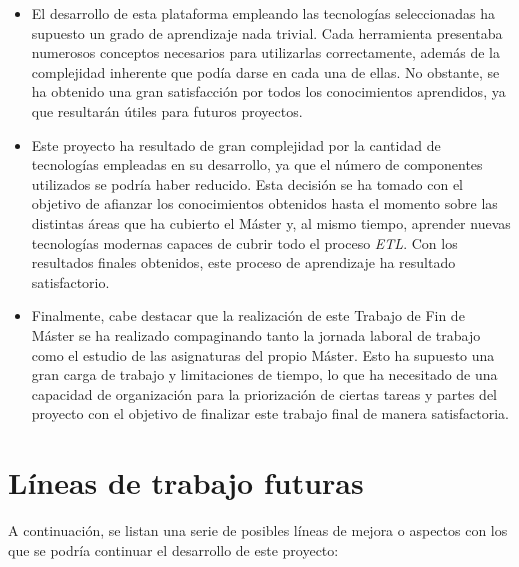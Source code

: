 \begin{itemize}
    \item El desarrollo de esta plataforma empleando las tecnologías seleccionadas ha supuesto un grado de aprendizaje nada trivial. Cada herramienta presentaba numerosos conceptos necesarios para utilizarlas correctamente, además de la complejidad inherente que podía darse en cada una de ellas. No obstante, se ha obtenido una gran satisfacción por todos los conocimientos aprendidos, ya que resultarán útiles para futuros proyectos.

    \item Este proyecto ha resultado de gran complejidad por la cantidad de tecnologías empleadas en su desarrollo, ya que el número de componentes utilizados se podría haber reducido. Esta decisión se ha tomado con el objetivo de afianzar los conocimientos obtenidos hasta el momento sobre las distintas áreas que ha cubierto el Máster y, al mismo tiempo, aprender nuevas tecnologías modernas capaces de cubrir todo el proceso \textit{ETL}. Con los resultados finales obtenidos, este proceso de aprendizaje ha resultado satisfactorio.

    \item Finalmente, cabe destacar que la realización de este Trabajo de Fin de Máster se ha realizado compaginando tanto la jornada laboral de trabajo como el estudio de las asignaturas del propio Máster. Esto ha supuesto una gran carga de trabajo y limitaciones de tiempo, lo que ha necesitado de una capacidad de organización para la priorización de ciertas tareas y partes del proyecto con el objetivo de finalizar este trabajo final de manera satisfactoria.

\end{itemize}

\section{Líneas de trabajo futuras}

A continuación, se listan una serie de posibles líneas de mejora o aspectos con los que se podría continuar el desarrollo de este proyecto:

